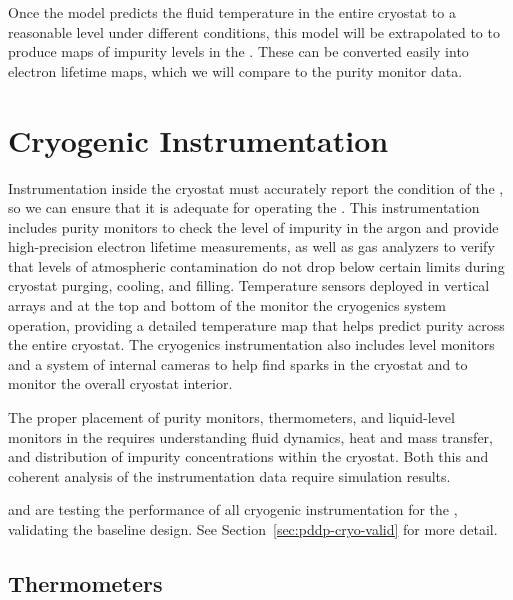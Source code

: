 Once the   model %
predicts the fluid temperature in the entire cryostat to a reasonable level under different conditions, this model will be extrapolated to    
to produce maps of impurity levels in the . These can be converted easily into electron lifetime maps, which we will %
compare to the %
 purity monitor data. 


\section{Cryogenic Instrumentation}
\label{sec:fdgen-cryo-instr}
Instrumentation inside the cryostat must accurately report the condition of the , so we can ensure that it is adequate for operating the .
This instrumentation includes %
purity monitors %
to check the level of impurity in the argon and %
provide high-precision electron lifetime measurements,
as well as gas analyzers to verify that levels of atmospheric contamination do not drop below certain limits during cryostat purging, cooling, and filling. 
Temperature sensors deployed in vertical arrays and at the top and bottom of the  monitor the cryogenics system operation, providing a 
detailed \threed temperature map that helps predict \lar purity across the entire cryostat. The cryogenics instrumentation also includes \lar level monitors and
a system of internal cameras to help find sparks in the cryostat and %
to monitor the overall cryostat interior. 

The proper placement of purity monitors, thermometers, and liquid-level monitors in the  requires %
understanding \lar fluid dynamics, heat and mass transfer, and distribution of impurity concentrations within the cryostat. %
Both this and %
coherent analysis of the instrumentation data require  simulation results.


 and  are testing the performance of all cryogenic instrumentation for the , validating the baseline  %
design. See Section~\ref{sec:pddp-cryo-valid} for more detail. 


\subsection{Thermometers}
\label{sec:fddp-cryo-therm}

